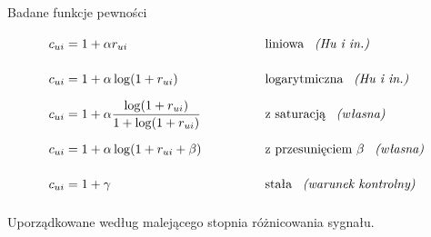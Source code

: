 \documentclass[aspectratio=169,11pt]{beamer}
\newcommand{\rownawysokosc}{\vphantom{\dfrac{\log(1+r)}{1+\log(1+r)}}}
\begin{document}
\begin{frame}{Badane funkcje pewności}
  \small
  \begin{alignat*}{2}
    c_{ui} &= 1 + \alpha r_{ui}\rownawysokosc
    &&\hspace{4em} \text{liniowa \hspace{0.5em}\emph{(Hu i in.)}} \\
    c_{ui} &= 1 + \alpha \log(1 + r_{ui})\rownawysokosc
    &&\hspace{4em} \text{logarytmiczna \hspace{0.5em}\emph{(Hu i in.)}} \\
    c_{ui} &= 1 + \alpha
    \frac{\log(1+r_{ui})}{1+\log(1+r_{ui})}\rownawysokosc
    &&\hspace{4em} \text{z saturacją \hspace{0.5em}\emph{(własna)}} \\
    c_{ui} &= 1 + \alpha \log(1 + r_{ui} + \beta)\rownawysokosc
    &&\hspace{4em} \text{z przesunięciem $\beta$ \hspace{0.5em}\emph{(własna)}} \\
    c_{ui} &= 1 + \gamma\rownawysokosc
    &&\hspace{4em} \text{stała \hspace{0.5em}\emph{(warunek kontrolny)}}
  \end{alignat*}

  \vspace{0.5em}
  \centering
  Uporządkowane według malejącego stopnia różnicowania sygnału.
\end{frame}

\end{document}
